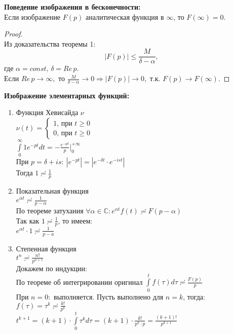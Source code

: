 \textbf{Поведение изображения в бесконечности:}\\[2mm]
Если изображение $F(p)$ аналитическая функция в $\infty$, то $F(\infty)=0$.\\

\begin{proof}
    \ \\
    Из доказательства теоремы 1:
    $$|F(p)|\leq \frac{M}{\delta - \alpha},$$ где $\alpha=const, \, \delta=Re\,p$.\\
    Если $Re\,p\to\infty,$ то $\frac{M}{\delta-\alpha}\to 0 \Rightarrow |F(p)|\to 0,$ т.к. $F(p)\to F(\infty)$.
\end{proof}

\textbf{Изображение элементарных функций:}
\begin{enumerate}
    \item Функция Хевисайда $\nu$\\
    $\nu(t)=
    \begin{cases}
        1\text{, при }t\geq 0\\
        0\text{, при }t\geq 0
    \end{cases}$\\
    $\int\limits_{0}^{\infty}1e^{-pt}dt=-\frac{e^{-pt}}{p}|_0^{+\infty}$\\
    При $p=\delta +i s: \ |e^{-pt}|=|e^{-\delta t}\cdot e^{-i s t}|$\\
    Тогда $1\risingdotseq \frac{1}{p}$

    \item Показательная функция\\
    $e^{\alpha t}\risingdotseq \frac{1}{p-\alpha}$\\
    По теореме затухания $\forall \alpha \in \mathbb{C}: e^{\alpha t} f(t) \risingdotseq F(p-\alpha)$\\
    Так как $1\risingdotseq \frac{1}{p}$, то имеем:\\
    $e^{\alpha t}\cdot 1 \risingdotseq \frac{1}{p-a}$

    \item Степенная функция\\
    $t^n \risingdotseq \frac{n!}{p^{n+1}}$\\
    Докажем по индукции:\\
    По теореме об интегрировании оригинал $\int\limits_{0}^{t} f(\tau)d\tau \risingdotseq \frac{F(p)}{p}$\\
    При $n=0:$ выполняется. Пусть выполнено для $n=k$, тогда:\\
    $f(\tau)=\tau^k \risingdotseq \frac{k!}{p^k}$\\
    $t^{k+1}=(k+1)\cdot\int\limits_{0}^{t}\tau^k d\tau = (k+1)\cdot \frac{k!}{p^k \cdot p} = \frac{(k+1)!}{p^{k+1}}$\\[2mm]
\end{enumerate}

